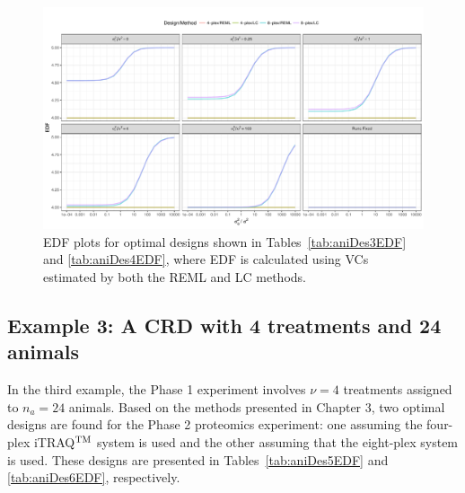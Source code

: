 \begin{figure}[!ht]
\centering
\includegraphics[width=1 \textwidth]{Chapter5/Graph/CRD822.pdf}
\caption{EDF plots for optimal designs shown in Tables~\ref{tab:aniDes3EDF} and \ref{tab:aniDes4EDF}, where EDF is calculated using VCs estimated by both the REML and LC methods.}
\label{fig:compare82CRD}
\end{figure}

\subsection{Example 3: A CRD with 4 treatments and 24 animals}
In the third example, the Phase 1 experiment involves $\nu = 4$ treatments assigned to $n_a = 24$ animals. Based on the methods presented in Chapter 3, two optimal designs are found for the Phase 2 proteomics experiment: one assuming the four-plex iTRAQ$^{\rm TM}$ system is used and the other assuming that the eight-plex system is used. These designs are presented in Tables~\ref{tab:aniDes5EDF} and \ref{tab:aniDes6EDF}, respectively.

